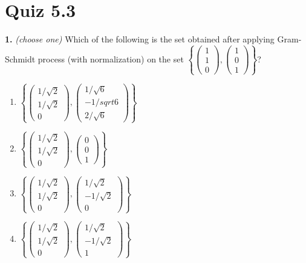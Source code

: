 \documentclass[10pt,a4paper]{article}
\begin{document}
\section{Quiz 5.3}
\textbf{1.} \textit{(choose one)} Which of the following is the set obtained after applying Gram-Schmidt process (with normalization) on the set \(\left\{\begin{pmatrix}1\\1\\0\end{pmatrix},\begin{pmatrix}1\\0\\1\end{pmatrix} \right\}\)?

\begin{enumerate}[label=(\Alph*)]
\item \(\left\{\begin{pmatrix}1/\sqrt{2}\\1/\sqrt{2}\\0\end{pmatrix},\begin{pmatrix}1/\sqrt{6}\\-1/sqrt{6}\\2/\sqrt{6}\end{pmatrix} \right\}\)
\item \(\left\{\begin{pmatrix}1/\sqrt{2}\\1/\sqrt{2}\\0\end{pmatrix},\begin{pmatrix}0\\0\\1\end{pmatrix} \right\}\)
\item \(\left\{\begin{pmatrix}1/\sqrt{2}\\1/\sqrt{2}\\0\end{pmatrix},\begin{pmatrix}1/\sqrt{2}\\-1/\sqrt{2}\\0\end{pmatrix} \right\}\)
\item \(\left\{\begin{pmatrix}1/\sqrt{2}\\1/\sqrt{2}\\0\end{pmatrix},\begin{pmatrix}1/\sqrt{2}\\-1/\sqrt{2}\\1\end{pmatrix} \right\}\)
\end{enumerate}
\end{document}
